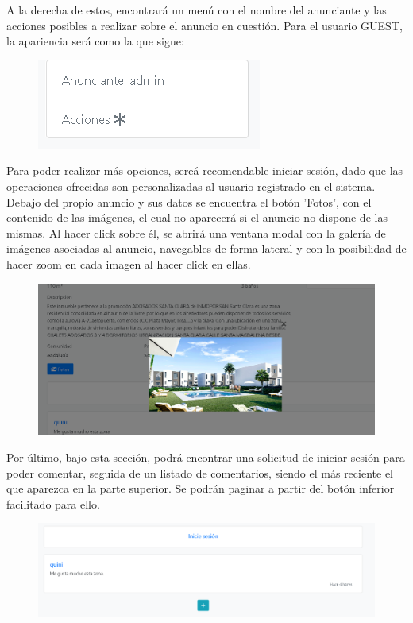 A la derecha de estos, encontrar\'{a} un men\'{u} con el nombre del anunciante y las acciones posibles a realizar sobre el anuncio en cuesti\'{o}n. Para el usuario GUEST, la apariencia ser\'{a} como la que sigue:

\begin{figure}[h!]
\centering
\includegraphics[width=.3\textwidth]{Img/ManualUsuario/LAGERAL_AD_GUEST.png}
\end{figure}

Para poder realizar m\'{a}s opciones, sere\'{a} recomendable iniciar sesi\'{o}n, dado que las operaciones ofrecidas son personalizadas al usuario registrado en el sistema.\\

Debajo del propio anuncio y sus datos se encuentra el bot\'{o}n 'Fotos', con el contenido de las im\'{a}genes, el cual no aparecer\'{a} si el anuncio no dispone de las mismas. Al hacer click sobre \'{e}l, se abrir\'{a} una ventana modal con la galer\'{i}a de im\'{a}genes asociadas al anuncio, navegables de forma lateral y con la posibilidad de hacer zoom en cada imagen al hacer click en ellas.

\begin{figure}[h!]
\centering
\includegraphics[width=.7\textwidth]{Img/ManualUsuario/GALERIA_GUEST.png}
\end{figure}

Por \'{u}ltimo, bajo esta secci\'{o}n, podr\'{a} encontrar una solicitud de iniciar sesi\'{o}n para poder comentar, seguida de un listado de comentarios, siendo el m\'{a}s reciente el que aparezca en la parte superior. Se podr\'{a}n paginar a partir del bot\'{o}n inferior facilitado para ello.

\begin{figure}[h!]
\centering
\includegraphics[width=.7\textwidth]{Img/ManualUsuario/COMENTARIOS_GUEST.png}
\end{figure}